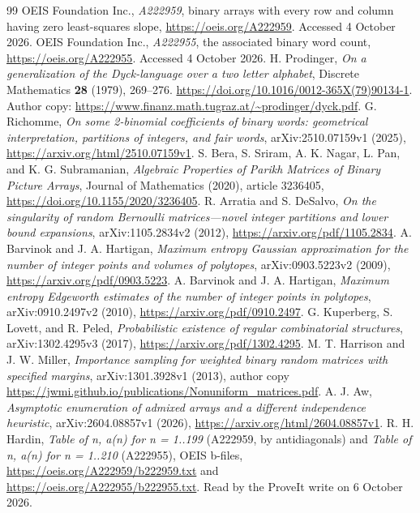 \documentclass[11pt]{article}
\theoremstyle{definition}\newtheorem{definition}[theorem]{Definition}
\theoremstyle{remark}\newtheorem{remark}[theorem]{Remark}
\begin{document}
\clearpage
\begin{thebibliography}{99}
 OEIS Foundation Inc., \emph{A222959}, binary arrays with every
row and column having zero least-squares slope,
\url{https://oeis.org/A222959}. Accessed 4 October 2026.
 OEIS Foundation Inc., \emph{A222955}, the associated binary
word count, \url{https://oeis.org/A222955}. Accessed 4 October 2026.
 H. Prodinger, \emph{On a generalization of the Dyck-language
over a two letter alphabet}, Discrete Mathematics \textbf{28} (1979), 269--276.
\url{https://doi.org/10.1016/0012-365X(79)90134-1}.
Author copy: \url{https://www.finanz.math.tugraz.at/~prodinger/dyck.pdf}.
 G. Richomme, \emph{On some 2-binomial coefficients of binary
words: geometrical interpretation, partitions of integers, and fair words},
arXiv:2510.07159v1 (2025), \url{https://arxiv.org/html/2510.07159v1}.
 S. Bera, S. Sriram, A. K. Nagar, L. Pan, and K. G. Subramanian,
\emph{Algebraic Properties of Parikh Matrices of Binary Picture Arrays},
Journal of Mathematics (2020), article 3236405,
\url{https://doi.org/10.1155/2020/3236405}.
 R. Arratia and S. DeSalvo, \emph{On the singularity of random
Bernoulli matrices---novel integer partitions and lower bound expansions},
arXiv:1105.2834v2 (2012), \url{https://arxiv.org/pdf/1105.2834}.
 A. Barvinok and J. A. Hartigan, \emph{Maximum entropy
Gaussian approximation for the number of integer points and volumes of
polytopes}, arXiv:0903.5223v2 (2009), \url{https://arxiv.org/pdf/0903.5223}.
 A. Barvinok and J. A. Hartigan, \emph{Maximum entropy
Edgeworth estimates of the number of integer points in polytopes},
arXiv:0910.2497v2 (2010), \url{https://arxiv.org/pdf/0910.2497}.
 G. Kuperberg, S. Lovett, and R. Peled, \emph{Probabilistic existence
of regular combinatorial structures}, arXiv:1302.4295v3 (2017),
\url{https://arxiv.org/pdf/1302.4295}.
 M. T. Harrison and J. W. Miller, \emph{Importance sampling
for weighted binary random matrices with specified margins},
arXiv:1301.3928v1 (2013), author copy
\url{https://jwmi.github.io/publications/Nonuniform_matrices.pdf}.
 A. J. Aw, \emph{Asymptotic enumeration of admixed arrays and a
different independence heuristic}, arXiv:2604.08857v1 (2026),
\url{https://arxiv.org/html/2604.08857v1}.
 R. H. Hardin, \emph{Table of n, a(n) for n = 1..199} (A222959,
by antidiagonals) and \emph{Table of n, a(n) for n = 1..210} (A222955), OEIS
b-files, \url{https://oeis.org/A222959/b222959.txt} and
\url{https://oeis.org/A222955/b222955.txt}. Read by the ProveIt write on
6 October 2026.
\end{thebibliography}
\end{document}
